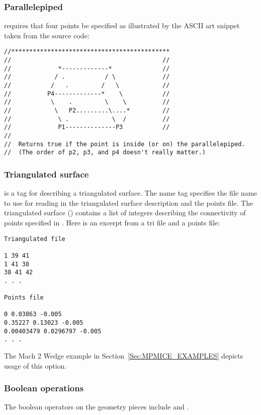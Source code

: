 \subsubsection{Parallelepiped}
 requires that four points be specified as
illustrated by the ASCII art snippet taken from the source code:

\begin{lstlisting}[backgroundcolor=\color{background}]
//********************************************
//                                          //
//             *-------------*              //
//            / .           / \             //
//           /   .         /   \            //
//          P4-------------*    \           //
//           \    .         \    \          //
//            \   P2.........\....*         //
//             \ .            \  /          //
//             P1--------------P3           //
//
//  Returns true if the point is inside (or on) the parallelepiped.
//  (The order of p2, p3, and p4 doesn't really matter.)
\end{lstlisting}

\subsubsection{Triangulated surface}
 is a tag for describing a triangulated surface.
The name tag specifies the file name to use for reading in the
triangulated surface description and the points file.  The
triangulated surface () contains a list of integers
describing the connectivity of points specified in .
Here is an excerpt from a tri file and a points file:

\begin{lstlisting}[backgroundcolor=\color{background}]
Triangulated file

1 39 41
1 41 38
38 41 42
. . .

Points file

0 0.03863 -0.005
0.35227 0.13023 -0.005
0.00403479 0.0296797 -0.005
. . .
\end{lstlisting}
The Mach 2 Wedge example in Section~\ref{Sec:MPMICE_EXAMPLES} depicts usage of
this option.

\subsubsection{Boolean operations}
The boolean operators on the geometry pieces include  and .

